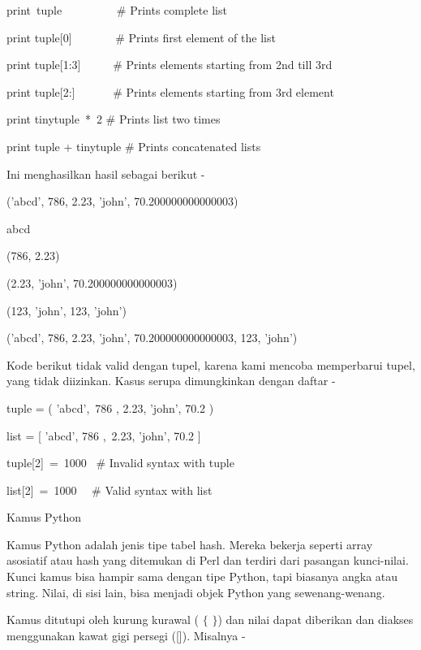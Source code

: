 \noindent 
print~tuple~~~~~~~~~   $  \#  $ Prints complete list \par
\noindent 
print tuple[0]~~~~~~~  $  \#  $ Prints first element of the list \par
\noindent 
print tuple[1:3]~~~~~  $  \#  $ Prints elements starting from 2nd till 3rd  \par
\noindent 
print tuple[2:]~~~~~~  $  \#  $ Prints elements starting from 3rd element \par
\noindent 
print tinytuple~*~2    $  \#  $ Prints list two times \par
\noindent 
print tuple + tinytuple  $  \#  $ Prints concatenated lists \par
\noindent 
Ini menghasilkan hasil sebagai berikut - \par
\noindent 
('abcd', 786, 2.23, 'john', 70.200000000000003) \par
\noindent 
abcd \par
\noindent 
(786, 2.23) \par
\noindent 
(2.23, 'john', 70.200000000000003) \par
\noindent 
(123, 'john', 123, 'john') \par
\noindent 
('abcd', 786, 2.23, 'john', 70.200000000000003, 123, 'john') \par
\noindent 
Kode berikut tidak valid dengan tupel, karena kami mencoba memperbarui tupel, yang tidak diizinkan. $  $Kasus serupa dimungkinkan dengan daftar - \par
\vspace{12pt}
\noindent 
tuple = ( 'abcd',~786 , 2.23, 'john', 70.2  ) \par
\noindent 
list = [ 'abcd', 786 ,~2.23, 'john', 70.2  ] \par
\noindent 
tuple[2]~=~1000~    $  \#  $ Invalid syntax with tuple \par
\noindent 
list[2]~=~1000~~    $  \#  $ Valid syntax with list \par
\noindent 
Kamus Python \par
\noindent 
Kamus Python adalah jenis tipe tabel hash. $  $Mereka bekerja seperti array asosiatif atau hash yang ditemukan di Perl dan terdiri dari pasangan kunci-nilai. $  $Kunci kamus bisa hampir sama dengan tipe Python, tapi biasanya angka atau string. $  $Nilai, di sisi lain, bisa menjadi objek Python yang sewenang-wenang. \par
\noindent 
Kamus ditutupi oleh kurung kurawal ( $  \{  $ $  \}  $) dan nilai dapat diberikan dan diakses menggunakan kawat gigi persegi ([]). $  $Misalnya - \par
